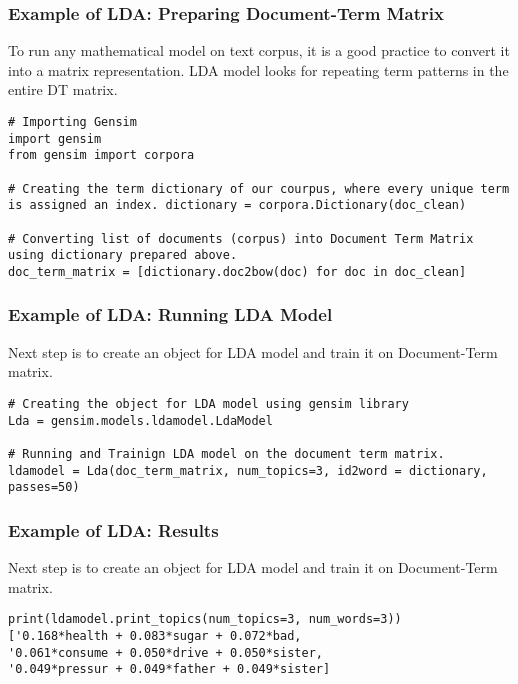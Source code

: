 \begin{frame}[fragile]\frametitle{Example of LDA: Preparing Document-Term Matrix}
To run any mathematical model on text corpus, it is a good practice to convert it into a matrix representation. LDA model looks for repeating term patterns in the entire DT matrix.
\begin{lstlisting}
# Importing Gensim
import gensim
from gensim import corpora

# Creating the term dictionary of our courpus, where every unique term is assigned an index. dictionary = corpora.Dictionary(doc_clean)

# Converting list of documents (corpus) into Document Term Matrix using dictionary prepared above.
doc_term_matrix = [dictionary.doc2bow(doc) for doc in doc_clean]
\end{lstlisting}
\end{frame}

\begin{frame}[fragile]\frametitle{Example of LDA: Running LDA Model}
Next step is to create an object for LDA model and train it on Document-Term matrix.
\begin{lstlisting}
# Creating the object for LDA model using gensim library
Lda = gensim.models.ldamodel.LdaModel

# Running and Trainign LDA model on the document term matrix.
ldamodel = Lda(doc_term_matrix, num_topics=3, id2word = dictionary, passes=50)
\end{lstlisting}
\end{frame}


\begin{frame}[fragile]\frametitle{Example of LDA: Results}
Next step is to create an object for LDA model and train it on Document-Term matrix.
\begin{lstlisting}
print(ldamodel.print_topics(num_topics=3, num_words=3))
['0.168*health + 0.083*sugar + 0.072*bad,
'0.061*consume + 0.050*drive + 0.050*sister,
'0.049*pressur + 0.049*father + 0.049*sister]
\end{lstlisting}
\end{frame}


